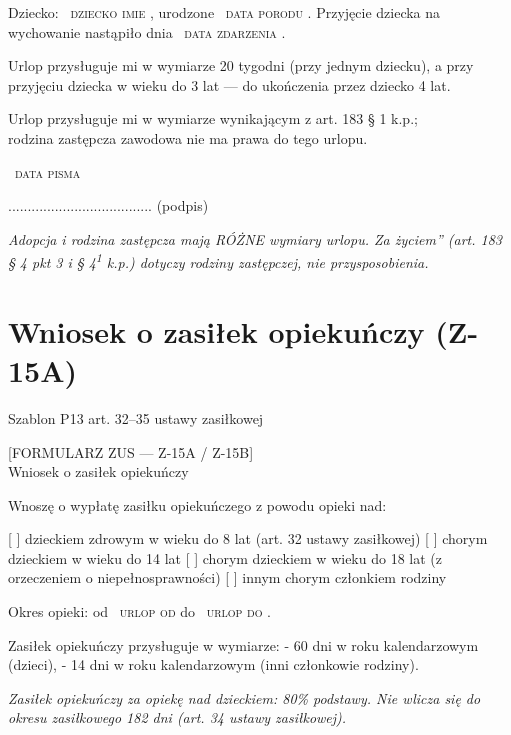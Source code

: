 \documentclass[11pt,a4paper]{article}
\newcommand{\Pole}[1]{%
  \textcolor{szary}{\dotfill}\,%
  {\scriptsize\textcolor{szary}{\textsc{#1}}}%
}
\newenvironment{warunek}[1]{%
  \par\smallskip\noindent\begin{minipage}{\linewidth}%
  \color{black}%
}{%
  \end{minipage}\par\smallskip%
}
\begin{document}
Dziecko: \Pole{dziecko imie}, urodzone \Pole{data porodu}.
Przyjęcie dziecka na wychowanie nastąpiło dnia \Pole{data zdarzenia}.

\begin{warunek}{jesli_przysposobienie}
Urlop przysługuje mi w wymiarze 20 tygodni (przy jednym dziecku), a przy\\[-2pt]
przyjęciu dziecka w wieku do 3 lat --- do ukończenia przez dziecko 4 lat.
\end{warunek}

\begin{warunek}{jesli_zastępca}
Urlop przysługuje mi w wymiarze wynikającym z art. 183 \S{} 1 k.p.;\\[-2pt]
rodzina zastępcza zawodowa nie ma prawa do tego urlopu.
\end{warunek}

\Pole{data pisma}
.....................................
(podpis)

\vfill
{\footnotesize\color{szary}\itshape Adopcja i rodzina zastępcza mają RÓŻNE wymiary urlopu. \quotedblbase{}Za życiem\textquotedblright{} (art. 183 \S{} 4 pkt 3 i \S{} 4\textsuperscript{1} k.p.) dotyczy rodziny zastępczej, nie przysposobienia. }

\clearpage

\section{Wniosek o zasiłek opiekuńczy (Z-15A)}

{\small\color{szary}Szablon P13 \textbullet{} art. 32--35 ustawy zasiłkowej}

[FORMULARZ ZUS --- Z-15A / Z-15B]\\[-2pt]
Wniosek o zasiłek opiekuńczy

Wnoszę o wypłatę zasiłku opiekuńczego z powodu opieki nad:

[ ] dzieckiem zdrowym w wieku do 8 lat (art. 32 ustawy zasiłkowej)
[ ] chorym dzieckiem w wieku do 14 lat
[ ] chorym dzieckiem w wieku do 18 lat (z orzeczeniem o niepełnosprawności)
[ ] innym chorym członkiem rodziny

Okres opieki: od \Pole{urlop od} do \Pole{urlop do}.

Zasiłek opiekuńczy przysługuje w wymiarze:
- 60 dni w roku kalendarzowym (dzieci),
- 14 dni w roku kalendarzowym (inni członkowie rodziny).

\vfill
{\footnotesize\color{szary}\itshape Zasiłek opiekuńczy za opiekę nad dzieckiem: 80\% podstawy. Nie wlicza się do okresu zasiłkowego 182 dni (art. 34 ustawy zasiłkowej). }
\end{document}
